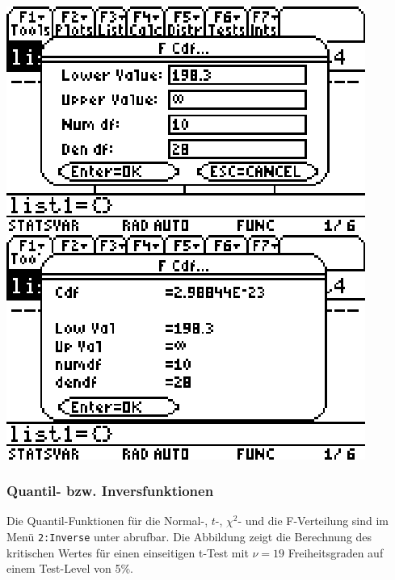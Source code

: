 \documentclass[a4paper,11pt,notitlepage,halfparskip,headsepline,normalheadings,twoside]{scrartcl}
\newlength{\tikey}
\newcommand{\keystroke}[1]{\settowidth{\tikey}{\scriptsize #1}\psframebox[framearc=0.2]{\parbox{\tikey}{\scriptsize\textsf{#1}}}}
\begin{document}
\begin{center}
\includegraphics{eps/Fdist1}
\includegraphics{eps/Fdist2}
\end{center}

\subsubsection{Quantil- bzw. Inversfunktionen}
Die Quantil-Funktionen für die Normal-, $t$-, $\chi^2$- und die F-Verteilung
sind im Menü \texttt{2:Inverse} unter \keystroke{F5} abrufbar. Die Abbildung
zeigt die Berechnung des kritischen Wertes für einen einseitigen t-Test mit
$\nu=19$ Freiheitsgraden auf einem Test-Level von 5\%.
\end{document}
